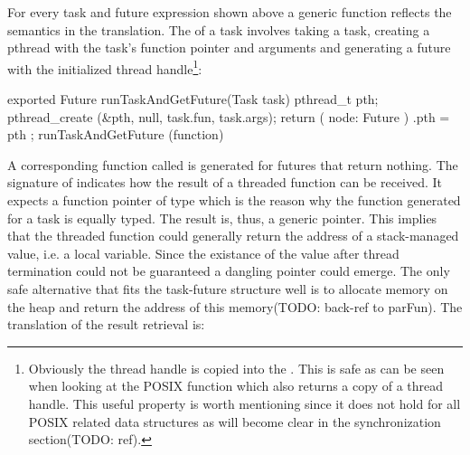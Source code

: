 For every task and future expression shown above a generic function reflects the semantics in the translation. The  of a task involves taking a task, creating a pthread with the task's function pointer and arguments and generating a future with the initialized thread handle\footnote{Obviously the thread handle is copied into the . This is safe as can be seen when looking at the POSIX function  which also returns a copy of a thread handle. This useful property is worth mentioning since it does not hold for all POSIX related data structures as will become clear in the synchronization section(TODO: ref).}:
\begin{ccode}
exported Future runTaskAndGetFuture(Task task) { 
  pthread_t pth; 
  pthread_create (&pth, null, task.fun, task.args);
  return ( node: Future ){ .pth = pth }; 
} runTaskAndGetFuture (function)
\end{ccode}
A corresponding function called  is generated for futures that return nothing. The signature of  indicates how the result of a threaded function can be received. It expects a function pointer of type  which is the reason why the function generated for a task is equally typed. The result is, thus, a generic  pointer. This implies that the threaded function could generally return the address of a stack-managed value, i.e. a local variable. Since the existance of the value after thread termination could not be guaranteed a dangling pointer\cite{UnderstandingAndUsingCPointers} could emerge. The only safe alternative that fits the task-future structure well is to allocate memory on the heap and return the address of this memory(TODO: back-ref to parFun). The translation of the result retrieval is:

